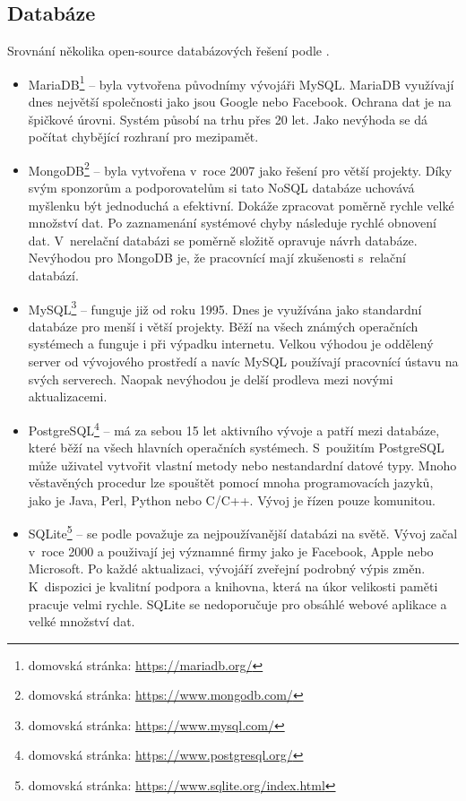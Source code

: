         \subsection{Databáze}
            Srovnání několika open-source databázových řešení podle \cite{database}.
            \begin{itemize}
                
                \item MariaDB\footnote{domovská stránka: \url{https://mariadb.org/}} – byla vytvořena původnímy vývojáři MySQL. MariaDB využívají dnes největší společnosti jako jsou Google nebo Facebook. Ochrana dat je na špičkové úrovni. Systém působí na trhu přes 20 let. Jako nevýhoda se dá počítat chybějící rozhraní pro mezipamět.
                
                \item MongoDB\footnote{domovská stránka: \url{https://www.mongodb.com/}} – byla vytvořena v~roce 2007 jako řešení pro větší projekty. Díky svým sponzorům a podporovatelům si tato NoSQL databáze uchovává myšlenku být jednoduchá a efektivní. Dokáže zpracovat poměrně rychle velké množství dat. Po zaznamenání systémové chyby následuje rychlé obnovení dat. V~nerelační databázi se poměrně složitě opravuje návrh databáze. Nevýhodou pro MongoDB je, že pracovnící mají zkušenosti s~relační databází.
                
                \item MySQL\footnote{domovská stránka: \url{https://www.mysql.com/}} – funguje již od roku 1995. Dnes je využívána jako standardní databáze pro menší i větší projekty. Běží na všech známých operačních systémech a funguje i při výpadku internetu. Velkou výhodou je oddělený server od vývojového prostředí a navíc MySQL používají pracovnící ústavu na svých serverech. Naopak nevýhodou je delší prodleva mezi novými aktualizacemi.
                
                \item PostgreSQL\footnote{domovská stránka: \url{https://www.postgresql.org/}} – má za sebou 15 let aktivního vývoje a patří mezi databáze, které běží na všech hlavních operačních systémech. S~použitím PostgreSQL může uživatel vytvořit vlastní metody nebo nestandardní datové typy. Mnoho věstavěných procedur lze spouštět pomocí mnoha programovacích jazyků, jako je Java, Perl, Python nebo C/C++. Vývoj je řízen pouze komunitou.
                
                \item SQLite\footnote{domovská stránka: \url{https://www.sqlite.org/index.html}} – se podle \cite{database} považuje za nejpoužívanější databázi na světě. Vývoj začal v~roce 2000 a použivají jej významné firmy jako je Facebook, Apple nebo Microsoft. Po každé aktualizaci, vývojáří zveřejní podrobný výpis změn. K~dispozici je kvalitní podpora a knihovna, která na úkor velikosti paměti pracuje velmi rychle. SQLite se nedoporučuje pro obsáhlé webové aplikace a velké množství dat. 
                
        \end{itemize}
        
